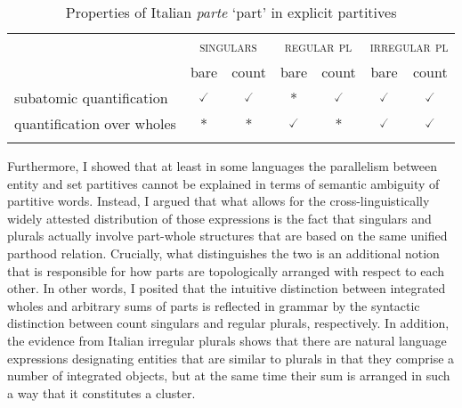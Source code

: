     \begin{table}[h!]
    \centering
\begin{tabular}{lcccccc}
\lsptoprule
                           & \multicolumn{2}{c}{\textsc{singulars}}          & \multicolumn{2}{c}{\textsc{regular pl}}    & \multicolumn{2}{c}{\textsc{irregular pl}}  \\
                           & bare & count & bare & count & bare & count \\ \midrule
subatomic quantification   & $\checked$                   & $\checked$                    & *                              & $\checked$                    & $\checked$                   & $\checked$                    \\
quantification over wholes & *                              & *                               & $\checked$                   & *                               & $\checked$                   & $\checked$                    \\ \lspbottomrule
\end{tabular}
\caption{Properties of Italian \textit{parte} `part' in explicit partitives}
\label{tab:properties-of-italian-parte2}
\end{table}

Furthermore, I showed that at least in some languages the parallelism between entity and set partitives cannot be explained in terms of semantic ambiguity of partitive words. Instead, I argued that what allows for the cross-linguistically widely attested distribution of those expressions is the fact that singulars and plurals actually involve part-whole structures that are based on the same unified parthood relation. Crucially, what distinguishes the two is an additional notion that is responsible for how parts are topologically arranged with respect to each other. In other words, I posited that the intuitive distinction between integrated wholes and arbitrary sums of parts is reflected in grammar by the syntactic distinction between count singulars and regular plurals, respectively. In addition, the evidence from Italian irregular plurals shows that there are natural language expressions designating entities that are similar to plurals in that they comprise a number of integrated objects, but at the same time their sum is arranged in such a way that it constitutes a cluster.

